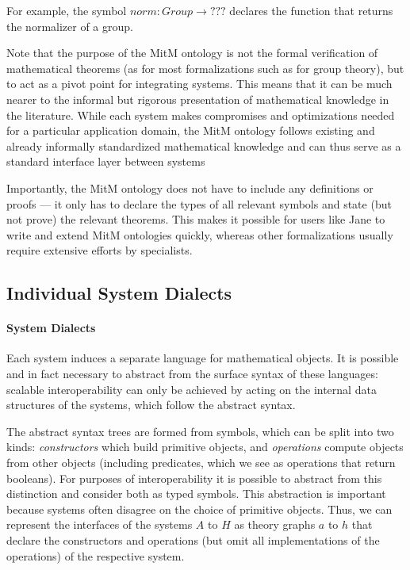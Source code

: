 For example, the symbol $norm: Group \to ???$ declares the function that returns the normalizer of a group.

Note that the purpose of the MitM ontology is not the formal verification of mathematical theorems (as for most formalizations such as \cite{Gonthier+:mcpoot13} for group theory), but to act as a pivot point for integrating systems.
This means that it can be much nearer to the informal but rigorous presentation of mathematical knowledge in the literature.
While each system makes compromises and optimizations needed for a particular application domain, the MitM ontology follows existing and already informally standardized mathematical knowledge and can thus serve as a standard interface layer between systems

Importantly, the MitM ontology does not have to include any definitions or proofs --- it only has to declare the types of all relevant symbols and state (but not prove) the relevant theorems.
This makes it possible for users like Jane to write and extend MitM ontologies quickly, whereas other formalizations usually require extensive efforts by specialists.

\subsection{Individual System Dialects}\label{sec:mitm:dialect}

\paragraph{System Dialects}
Each system induces a separate language for mathematical objects.
It is possible and in fact necessary to abstract from the surface syntax of these languages: scalable interoperability can only be achieved by acting on the internal data structures of the systems, which follow the abstract syntax.

The abstract syntax trees are formed from symbols, which can be split into two kinds: \emph{constructors} which build primitive objects, and \emph{operations} compute objects from other objects (including predicates, which we see as operations that return booleans).
For purposes of interoperability it is possible to abstract from this distinction and consider both as typed symbols.
This abstraction is important because systems often disagree on the choice of primitive objects.
Thus, we can represent the interfaces of the systems $A$ to $H$ as \OMMT theory graphs $a$ to $h$ that declare the constructors and operations (but omit all implementations of the operations) of the respective system.

